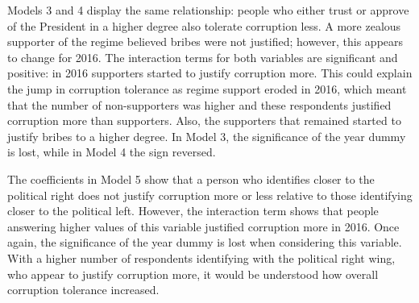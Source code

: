 \documentclass[12pt,a4]{article}\usepackage[]{graphicx}\usepackage[]{xcolor}
\begin{document}
Models 3 and 4 display the same relationship: people who either trust or approve of the President in a higher degree also tolerate corruption less. A more zealous supporter of the regime believed bribes were not justified; however, this appears to change for 2016. The interaction terms for both variables are significant and positive: in 2016 supporters started to justify corruption more. This could explain the jump in corruption tolerance as regime support eroded in 2016, which meant that the number of non-supporters was higher and these respondents justified corruption more than supporters. Also, the supporters that remained started to justify bribes to a higher degree. In Model 3, the significance of the year dummy is lost, while in Model 4 the sign reversed.

The coefficients in Model 5 show that a person who identifies closer to the political right does not justify corruption more or less relative to those identifying closer to the political left. However, the interaction term shows that people answering higher values of this variable justified corruption more in 2016. Once again, the significance of the year dummy is lost when considering this variable. With a higher number of respondents identifying with the political right wing, who appear to justify corruption more, it would be understood how overall corruption tolerance increased.


\end{document}
